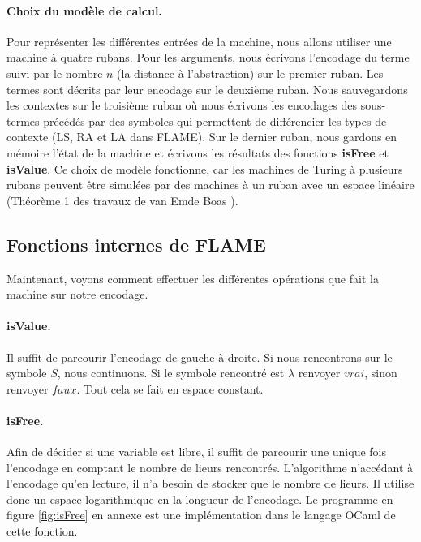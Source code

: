 \documentclass[a4paper, 11pt]{article}
\theoremstyle{definition}
\begin{document}
\paragraph{Choix du modèle de calcul.}
Pour représenter les différentes entrées de la machine, nous allons utiliser une machine à quatre rubans. Pour les arguments, nous écrivons l'encodage du terme suivi par le nombre $n$ (la \og distance à l'abstraction) sur le premier ruban. Les termes sont décrits par leur encodage sur le deuxième ruban. Nous sauvegardons les contextes sur le troisième ruban où nous écrivons les encodages des sous-termes précédés par des symboles qui permettent de différencier les types de contexte (LS, RA et LA dans FLAME). Sur le dernier ruban, nous gardons en mémoire l'état de la machine et écrivons les résultats des fonctions \textbf{isFree} et \textbf{isValue}.
Ce choix de modèle fonctionne, car les machines de Turing à plusieurs rubans peuvent être simulées par des machines à un ruban avec un espace linéaire (Théorème 1 des travaux de van Emde Boas \cite{van1987machine}). 
\subsection{Fonctions internes de FLAME}

Maintenant, voyons comment effectuer les différentes opérations que fait la machine sur notre encodage.

\paragraph{isValue.} Il suffit de parcourir l'encodage de gauche à droite. Si nous rencontrons sur le symbole $S$, nous continuons. Si le symbole rencontré est $\lambda$ renvoyer $vrai$, sinon renvoyer $faux$. Tout cela se fait en espace constant.
\paragraph{isFree.} Afin de décider si une variable est libre, il suffit de parcourir une unique fois l'encodage en comptant le nombre de lieurs rencontrés.
L'algorithme n'accédant à l'encodage qu'en lecture, il n'a besoin de stocker que le nombre de lieurs.
Il utilise donc un espace logarithmique en la longueur de l'encodage.
Le programme en figure \ref{fig:isFree} en annexe est une implémentation dans le langage OCaml de cette fonction.
\end{document}

